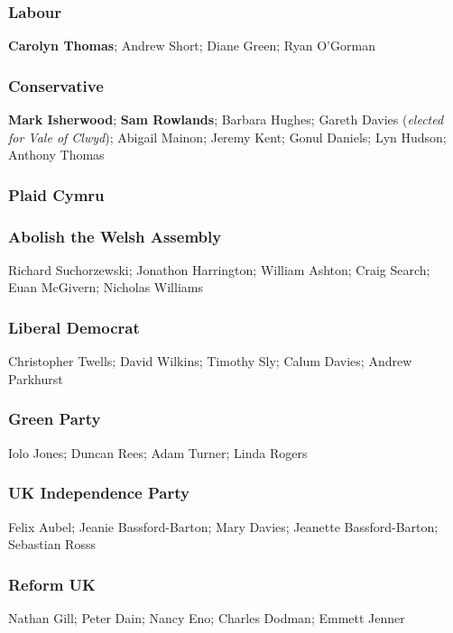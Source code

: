 \begin{resultsiii}
	\subsubsection*{Labour}
	\textbf{Carolyn Thomas}; Andrew Short; Diane Green; Ryan O'Gorman
	
	\subsubsection*{Conservative}
	\textbf{Mark Isherwood}; \textbf{Sam Rowlands}; Barbara Hughes; Gareth Davies (\emph{elected for Vale of Clwyd}); Abigail Mainon; Jeremy Kent; Gonul Daniels; Lyn Hudson; Anthony Thomas
	
	\subsubsection*{Plaid Cymru}
	
	\subsubsection*{Abolish the Welsh Assembly}
	Richard Suchorzewski; Jonathon Harrington; William Ashton; Craig Search; Euan McGivern; Nicholas Williams
	
	\subsubsection*{Liberal Democrat}
	Christopher Twells; David Wilkins; Timothy Sly; Calum Davies; Andrew Parkhurst
	
	\subsubsection*{Green Party}
	Iolo Jones; Duncan Rees; Adam Turner; Linda Rogers
	
	\subsubsection*{UK Independence Party}
	Felix Aubel; Jeanie Bassford-Barton; Mary Davies; Jeanette Bassford-Barton; Sebastian Rosss
	
	\subsubsection*{Reform UK}
	Nathan Gill; Peter Dain; Nancy Eno; Charles Dodman; Emmett Jenner
	

\end{resultsiii}
